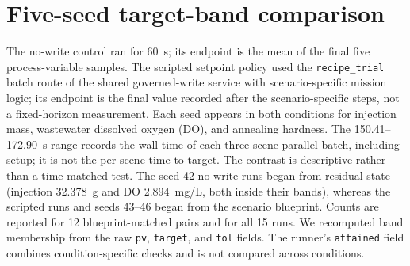 \documentclass[10pt]{article}
\begin{document}
\section*{Five-seed target-band comparison}
The no-write control ran for 60~s; its endpoint is the mean of the final five process-variable samples. The scripted setpoint policy used the \texttt{recipe\_trial} batch route of the shared governed-write service with scenario-specific mission logic; its endpoint is the final value recorded after the scenario-specific steps, not a fixed-horizon measurement. Each seed appears in both conditions for injection mass, wastewater dissolved oxygen (DO), and annealing hardness. The 150.41--172.90~s range records the wall time of each three-scene parallel batch, including setup; it is not the per-scene time to target. The contrast is descriptive rather than a time-matched test. The seed-42 no-write runs began from residual state (injection 32.378~g and DO 2.894~mg/L, both inside their bands), whereas the scripted runs and seeds 43--46 began from the scenario blueprint. Counts are reported for 12 blueprint-matched pairs and for all 15 runs. We recomputed band membership from the raw \texttt{pv}, \texttt{target}, and \texttt{tol} fields. The runner's \texttt{attained} field combines condition-specific checks and is not compared across conditions.
\end{document}
